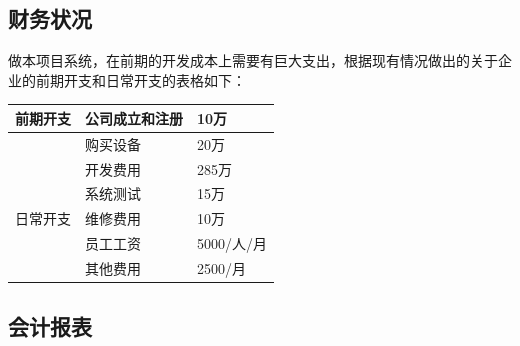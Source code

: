 \documentclass[master]{hduthesis}
\begin{document}
\subsection{财务状况}
做本项目系统，在前期的开发成本上需要有巨大支出，根据现有情况做出的关于企业的前期开支和日常开支的表格如下：
\begin{table}[H]
	\centering
	\begin{tabular}{|l|l|l|}
		\hline
		前期开支 & 公司成立和注册 & 10万       \\ \hline
		         & 购买设备       & 20万       \\ \hline
		         & 开发费用       & 285万      \\ \hline
		         & 系统测试       & 15万       \\ \hline
		日常开支 & 维修费用       & 10万       \\ \hline
		         & 员工工资       & 5000/人/月 \\ \hline
		         & 其他费用       & 2500/月    \\ \hline
	\end{tabular}
\end{table}
\subsection{会计报表}
\end{document}
